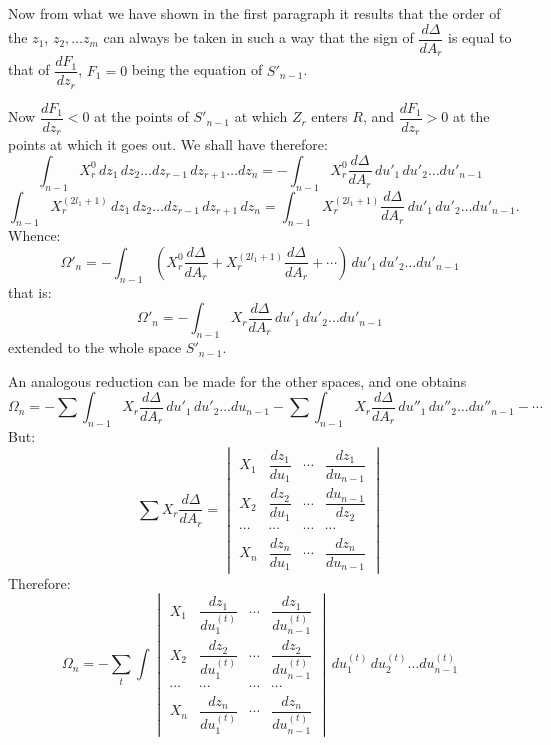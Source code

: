 \documentclass{article}
\begin{document}
Now from what we have shown in the first paragraph it results that the order of the $z_{1}$, $z_{2},\ldots z_{m}$ can always be taken in such a way that the sign of $\dfrac{d\Delta}{dA_{r}}$ is equal to that of $\dfrac{dF_{1}}{dz_{r}}$, $F_{1} = 0$ being the equation of $S'_{n-1}$.

Now $\dfrac{dF_{1}}{dz_{r}} < 0$ at the points of $S'_{n-1}$ at which $Z_{r}$ enters $R$, and $\dfrac{dF_{1}}{dz_{r}} > 0$ at the points at which it goes out. We shall have therefore:
\[ \int_{n-1} X_{r}^{0}\,dz_{1}\,dz_{2}\ldots dz_{r-1}\,dz_{r+1}\ldots dz_{n} = - \int_{n-1} X_{r}^{0} \frac{d\Delta}{dA_{r}}\,du'_{1}\,du'_{2}\ldots du'_{n-1} \]
\[ \int_{n-1} X_{r}^{(2l_{1}+1)}\,dz_{1}\,dz_{2}\ldots dz_{r-1}\,dz_{r+1}\,dz_{n} = \int_{n-1} X_{r}^{(2l_{1}+1)} \frac{d\Delta}{dA_{r}}\,du'_{1}\,du'_{2}\ldots du'_{n-1}. \]
Whence:
\[ \Omega'_{n} = - \int_{n-1} \left( X_{r}^{0} \frac{d\Delta}{dA_{r}} + X_{r}^{(2l_{1}+1)} \frac{d\Delta}{dA_{r}} + \cdots \right)\,du'_{1}\,du'_{2}\ldots du'_{n-1} \]
that is:
\[ \Omega'_{n} = - \int_{n-1} X_{r} \frac{d\Delta}{dA_{r}}\,du'_{1}\,du'_{2}\ldots du'_{n-1} \]
extended to the whole space $S'_{n-1}$.


An analogous reduction can be made for the other spaces, and one obtains
\[ \Omega_{n} = - \sum \int_{n-1} X_{r} \frac{d\Delta}{dA_{r}}\,du'_{1}\,du'_{2}\ldots du_{n-1} - \sum \int_{n-1} X_{r} \frac{d\Delta}{dA_{r}}\,du''_{1}\,du''_{2}\ldots du''_{n-1} - \cdots \]
But:
\[ \sum X_{r} \frac{d\Delta}{dA_{r}} = \begin{vmatrix} X_{1} & \dfrac{dz_{1}}{du_{1}} & \cdots & \dfrac{dz_{1}}{du_{n-1}} \\ X_{2} & \dfrac{dz_{2}}{du_{1}} & \cdots & \dfrac{du_{n-1}}{dz_{2}} \\ \cdots & \cdots & \cdots & \cdots \\ X_{n} & \dfrac{dz_{n}}{du_{1}} & \cdots & \dfrac{dz_{n}}{du_{n-1}} \end{vmatrix} \]
Therefore:
\[ \Omega_{n} = - \sum_{t} \int \begin{vmatrix} X_{1} & \dfrac{dz_{1}}{du^{(t)}_{1}} & \cdots & \dfrac{dz_{1}}{du^{(t)}_{n-1}} \\ X_{2} & \dfrac{dz_{2}}{du^{(t)}_{1}} & \cdots & \dfrac{dz_{2}}{du^{(t)}_{n-1}} \\ \cdots & \cdots & \cdots & \cdots \\ X_{n} & \dfrac{dz_{n}}{du^{(t)}_{1}} & \cdots & \dfrac{dz_{n}}{du^{(t)}_{n-1}} \end{vmatrix}\,du^{(t)}_{1}\,du^{(t)}_{2}\ldots du^{(t)}_{n-1} \tag{3} \]
\end{document}
